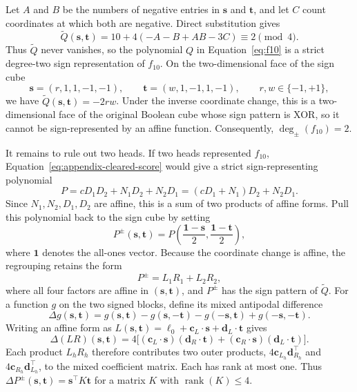 \documentclass{article}
\theoremstyle{definition}
\theoremstyle{plain}
\newcommand{\tdeg}{\deg_{\pm}}
\begin{document}
Let $A$ and $B$ be the numbers of negative entries in $\mathbf{s}$ and $\mathbf{t}$, and let $C$ count coordinates at which both are negative. Direct substitution gives
\begin{equation}
\widetilde Q(\mathbf{s},\mathbf{t})=10+4(-A-B+AB-3C)\equiv2\pmod 4.
\label{eq:f10-mod-four}
\end{equation}
Thus $\widetilde Q$ never vanishes, so the polynomial $Q$ in Equation~\eqref{eq:f10} is a strict degree-two sign representation of $f_{10}$. On the two-dimensional face of the sign cube
\begin{equation}
\mathbf{s}=(r,1,1,-1,-1),\qquad
\mathbf{t}=(w,1,-1,1,-1),\qquad r,w\in\{-1,+1\},
\end{equation}
we have $\widetilde Q(\mathbf{s},\mathbf{t})=-2rw$. Under the inverse coordinate change, this is a two-dimensional face of the original Boolean cube whose sign pattern is XOR, so it cannot be sign-represented by an affine function. Consequently, $\tdeg(f_{10})=2$.

It remains to rule out two heads. If two heads represented $f_{10}$, Equation~\eqref{eq:appendix-cleared-score} would give a strict sign-representing polynomial
\begin{equation}
P=cD_1D_2+N_1D_2+N_2D_1=(cD_1+N_1)D_2+N_2D_1.
\label{eq:two-head-regrouping}
\end{equation}
Since $N_1,N_2,D_1,D_2$ are affine, this is a sum of two products of affine forms. Pull this polynomial back to the sign cube by setting
\begin{equation}
P^{\pm}(\mathbf{s},\mathbf{t})=
P\left(\frac{\mathbf{1}-\mathbf{s}}{2},
       \frac{\mathbf{1}-\mathbf{t}}{2}\right),
\end{equation}
where $\mathbf{1}$ denotes the all-ones vector. Because the coordinate change is affine, the regrouping retains the form
\begin{equation}
P^{\pm}=L_1R_1+L_2R_2,
\label{eq:two-products}
\end{equation}
where all four factors are affine in $(\mathbf{s},\mathbf{t})$, and $P^{\pm}$ has the sign pattern of $\widetilde Q$. For a function $g$ on the two signed blocks, define its mixed antipodal difference
\begin{equation}
\Delta g(\mathbf{s},\mathbf{t})=
g(\mathbf{s},\mathbf{t})-g(\mathbf{s},-\mathbf{t})
-g(-\mathbf{s},\mathbf{t})+g(-\mathbf{s},-\mathbf{t}).
\end{equation}
Writing an affine form as $L(\mathbf{s},\mathbf{t})=\ell_0+\mathbf{c}_L\cdot\mathbf{s}+\mathbf{d}_L\cdot\mathbf{t}$ gives
\begin{equation}
\Delta(LR)(\mathbf{s},\mathbf{t})=
4\bigl[(\mathbf{c}_L\cdot\mathbf{s})(\mathbf{d}_R\cdot\mathbf{t})
+(\mathbf{c}_R\cdot\mathbf{s})(\mathbf{d}_L\cdot\mathbf{t})\bigr].
\label{eq:mixed-product}
\end{equation}
Each product $L_hR_h$ therefore contributes two outer products, $4\mathbf{c}_{L_h}\mathbf{d}_{R_h}^{\top}$ and $4\mathbf{c}_{R_h}\mathbf{d}_{L_h}^{\top}$, to the mixed coefficient matrix. Each has rank at most one. Thus $\Delta P^{\pm}(\mathbf{s},\mathbf{t})=\mathbf{s}^{\top}K\mathbf{t}$ for a matrix $K$ with $\operatorname{rank}(K)\leq4$.
\end{document}
